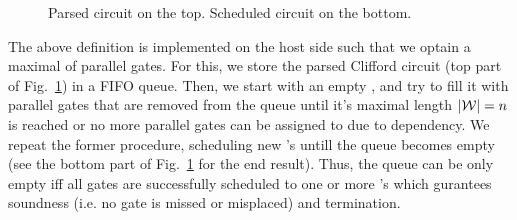 \documentclass[runningheads]{llncs}
\begin{document}
\begin{figure}[t]
	
	\caption{Parsed circuit on the top. Scheduled circuit on the bottom.}
	\label{fig:circuit}
\end{figure}

The above definition is implemented on the host side such that we optain a maximal \circuitWindow of parallel gates. For this, we store the parsed Clifford circuit (top part of Fig.~\ref{fig:circuit}) in a FIFO queue. Then, we start with an empty \circuitWindow, and try to fill it with parallel gates that are removed from the queue until it's maximal length $|\mathcal{W}| = n$ is reached or no more parallel gates can be assigned to \circuitWindow due to dependency. We repeat the former procedure, scheduling new \circuitWindow's untill the queue becomes empty (see the bottom part of Fig.~\ref{fig:circuit} for the end result). Thus, the queue can be only empty iff all gates are successfully scheduled to one or more \circuitWindow's which gurantees soundness (i.e. no gate is missed or misplaced) and termination.
\end{document}
